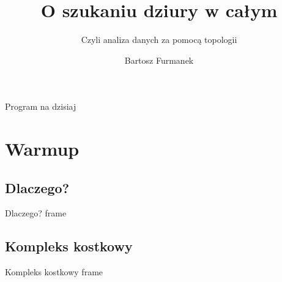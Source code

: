\documentclass{beamer}
\title{O szukaniu dziury w całym}
\subtitle{Czyli analiza danych za pomocą topologii}
\author{Bartosz Furmanek}
\date{}
\begin{document}
\begin{frame}
    \titlepage 
\end{frame}

\begin{frame}{Program na dzisiaj}
    \tableofcontents
\end{frame}

\section{Warmup}
\subsection{Dlaczego?}
\begin{frame}{Dlaczego?}
  frame
\end{frame}

\subsection{Kompleks kostkowy}
\begin{frame}{Kompleks kostkowy}
  frame
\end{frame}
\end{document}
